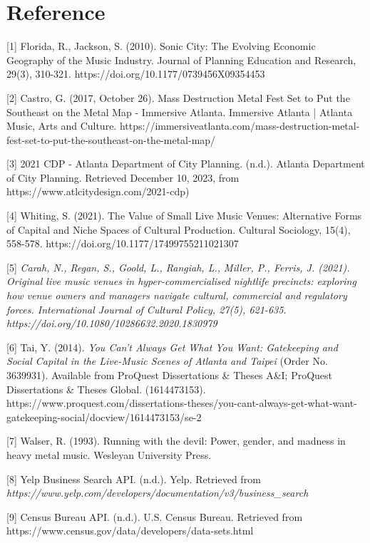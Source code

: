 \documentclass[11pt]{article}
\begin{document}
\section{Reference}

{[}1{]} Florida, R., Jackson, S. (2010). Sonic City: The Evolving Economic Geography of the Music Industry. Journal of Planning Education and Research, 29(3), 310-321. https://doi.org/10.1177/0739456X09354453

{[}2{]} Castro, G. (2017, October 26). Mass Destruction Metal Fest Set to Put the Southeast on the Metal Map - Immersive Atlanta. Immersive Atlanta | Atlanta Music, Arts and Culture. https://immersiveatlanta.com/mass-destruction-metal-fest-set-to-put-the-southeast-on-the-metal-map/

{[}3{]} 2021 CDP - Atlanta Department of City Planning. (n.d.). Atlanta Department of City Planning. Retrieved December 10, 2023, from https://www.atlcitydesign.com/2021-cdp)

{[}4{]} Whiting, S. (2021). The Value of Small Live Music Venues: Alternative Forms of Capital and Niche Spaces of Cultural Production. Cultural Sociology, 15(4), 558-578. https://doi.org/10.1177/17499755211021307

{[}5{]} \textit{Carah, N., Regan, S., Goold, L., Rangiah, L., Miller, P., Ferris, J. (2021). Original live music venues in hyper-commercialised nightlife precincts: exploring how venue owners and managers navigate cultural, commercial and regulatory forces. International Journal of Cultural Policy, 27(5), 621-635. https://doi.org/10.1080/10286632.2020.1830979}

{[}6{]} Tai, Y. (2014). \textit{You Can't Always Get What You Want: Gatekeeping and Social Capital in the Live-Music Scenes of Atlanta and Taipei} (Order No. 3639931). Available from ProQuest Dissertations \& Theses A\&I; ProQuest Dissertations \& Theses Global. (1614473153). https://www.proquest.com/dissertations-theses/you-cant-always-get-what-want-gatekeeping-social/docview/1614473153/se-2

{[}7{]} Walser, R. (1993). Running with the devil: Power, gender, and madness in heavy metal music. Wesleyan University Press.

{[}8{]} Yelp Business Search API. (n.d.). Yelp. Retrieved from \textit{https://www.yelp.com/developers/documentation/v3/business\_search}

{[}9{]} Census Bureau API. (n.d.). U.S. Census Bureau. Retrieved from https://www.census.gov/data/developers/data-sets.html
\end{document}
